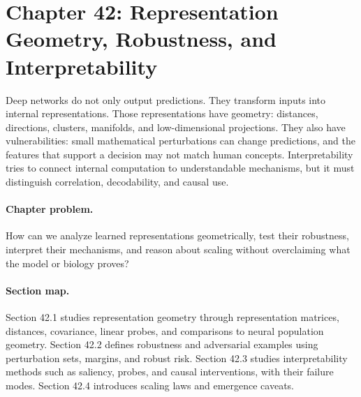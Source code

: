 \section{Chapter 42: Representation Geometry, Robustness, and Interpretability}
\label{ch:representation-geometry-robustness-interpretability}

Deep networks do not only output predictions. They transform inputs into internal representations. Those representations have geometry: distances, directions, clusters, manifolds, and low-dimensional projections. They also have vulnerabilities: small mathematical perturbations can change predictions, and the features that support a decision may not match human concepts. Interpretability tries to connect internal computation to understandable mechanisms, but it must distinguish correlation, decodability, and causal use.

\paragraph{Chapter problem.}
How can we analyze learned representations geometrically, test their robustness, interpret their mechanisms, and reason about scaling without overclaiming what the model or biology proves?

\paragraph{Section map.}
Section 42.1 studies representation geometry through representation matrices, distances, covariance, linear probes, and comparisons to neural population geometry. Section 42.2 defines robustness and adversarial examples using perturbation sets, margins, and robust risk. Section 42.3 studies interpretability methods such as saliency, probes, and causal interventions, with their failure modes. Section 42.4 introduces scaling laws and emergence caveats.

